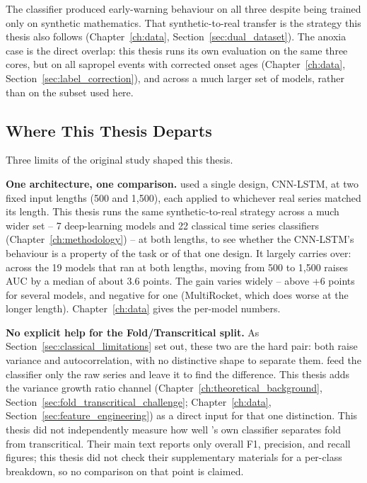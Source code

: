 The classifier produced early-warning behaviour on all three despite being trained only on synthetic mathematics. That synthetic-to-real transfer is the strategy this thesis also follows (Chapter~\ref{ch:data}, Section~\ref{sec:dual_dataset}). The anoxia case is the direct overlap: this thesis runs its own evaluation on the same three cores, but on all sapropel events with corrected onset ages (Chapter~\ref{ch:data}, Section~\ref{sec:label_correction}), and across a much larger set of models, rather than on the subset used here.

\subsection{Where This Thesis Departs}
Three limits of the original study shaped this thesis.

\textbf{One architecture, one comparison.} \citet{bury2021} used a single design, CNN-LSTM, at two fixed input lengths (500 and 1{,}500), each applied to whichever real series matched its length. This thesis runs the same synthetic-to-real strategy across a much wider set -- 7 deep-learning models and 22 classical time series classifiers (Chapter~\ref{ch:methodology}) -- at both lengths, to see whether the CNN-LSTM's behaviour is a property of the task or of that one design. It largely carries over: across the 19 models that ran at both lengths, moving from 500 to 1{,}500 raises AUC by a median of about 3.6 points. The gain varies widely -- above +6 points for several models, and negative for one (MultiRocket, which does worse at the longer length). Chapter~\ref{ch:data} gives the per-model numbers.

\textbf{No explicit help for the Fold/Transcritical split.} As Section~\ref{sec:classical_limitations} set out, these two are the hard pair: both raise variance and autocorrelation, with no distinctive shape to separate them. \citet{bury2021} feed the classifier only the raw series and leave it to find the difference. This thesis adds the variance growth ratio channel (Chapter~\ref{ch:theoretical_background}, Section~\ref{sec:fold_transcritical_challenge}; Chapter~\ref{ch:data}, Section~\ref{sec:feature_engineering}) as a direct input for that one distinction. This thesis did not independently measure how well \citet{bury2021}'s own classifier separates fold from transcritical. Their main text reports only overall F1, precision, and recall figures; this thesis did not check their supplementary materials for a per-class breakdown, so no comparison on that point is claimed.

